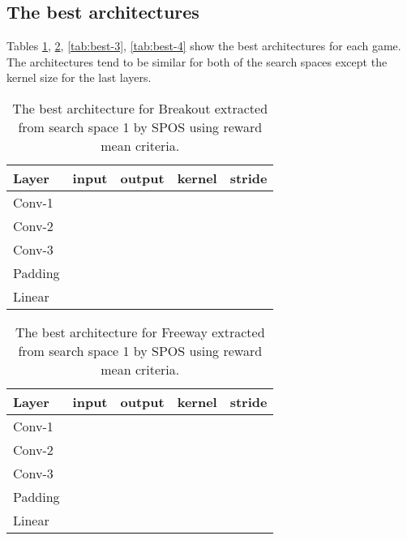 \documentclass{svproc}
\begin{document}
\begin{appendix}
\section{The best architectures}
\label{app:found-architectures}
Tables \ref{tab:best-1}, \ref{tab:best-2}, \ref{tab:best-3}, \ref{tab:best-4} show the best architectures for each game.  The architectures tend to be similar for both of the search spaces except the kernel size for the last layers.
\begin{table}[!h]
\begin{center}
\begin{tabularx}{0.5\textwidth}{@{}lcccc@{}}
    \hline
    \textbf{Layer} & \textbf{input} & \textbf{output} & \textbf{kernel} & \textbf{stride}\\
    \hline
        Conv-1 &  &  &  &          \\
        Conv-2 &  &  &  &         \\
        Conv-3 &  &  &  &         \\
        Padding &  &  &  &     \\        
        Linear &  &  &  &    \\
    \hline
\end{tabularx}
\caption{The best architecture for Breakout extracted from search space 1 by SPOS using reward mean criteria.}\label{tab:best-1}
\end{center}
\end{table}

\begin{table}[!h]
\begin{center}
\begin{tabularx}{0.5\textwidth}{@{}lcccc@{}}
    \hline
    \textbf{Layer} & \textbf{input} & \textbf{output} & \textbf{kernel} & \textbf{stride}\\
    \hline
        Conv-1 &  &  &  &          \\
        Conv-2 &  &  &  &         \\
        Conv-3 &  &  &  &         \\
        Padding &  &  &  &     \\        
        Linear &  &  &  &    \\
    \hline
\end{tabularx}
\caption{The best architecture for Freeway extracted from search space 1 by SPOS using reward mean criteria.}\label{tab:best-2}
\end{center}
\end{table}


\end{appendix}
\end{document}
